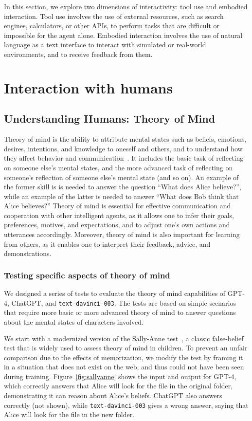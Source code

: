In this section, we explore two dimensions of interactivity: tool use and embodied interaction. Tool use involves the use of external resources, such as search engines, calculators, or other APIs, to perform tasks that are difficult or impossible for the agent alone. Embodied interaction involves the use of natural language as a text interface to interact with simulated or real-world environments, and to receive feedback from them. 

\section{Interaction with humans}
\label{sec:humans}

\subsection{Understanding Humans: Theory of Mind}
\label{sec:mind}

Theory of mind is the ability to attribute mental states such as beliefs, emotions, desires, intentions, and knowledge to oneself and others, and to understand how they affect behavior and communication~\cite{wellman1992child}. It includes the basic task of reflecting on someone else's mental states, and the more advanced task of reflecting on someone's reflection of someone else's mental state (and so on). An example of the former skill is is needed to answer the question ``What does Alice believe?'', while an example of the latter is needed to answer ``What does Bob think that Alice believes?'' Theory of mind is essential for effective communication and cooperation with other intelligent agents, as it allows one to infer their goals, preferences, motives, and expectations, and to adjust one's own actions and utterances accordingly. Moreover, theory of mind is also important for learning from others, as it enables one to interpret their feedback, advice, and demonstrations.

\subsubsection{Testing specific aspects of theory of mind} We designed a series of tests to evaluate the theory of mind capabilities of {GPT-4}, ChatGPT, and \texttt{text-davinci-003}. The tests are based on simple scenarios that require more basic or more advanced theory of mind to answer questions about the mental states of characters involved.

We start with a modernized version of the Sally-Anne test~\cite{baron1985does}, a classic false-belief test that is widely used to assess theory of mind in children. To prevent an unfair comparison due to the effects of memorization, we modify the test by framing it in a situation that does not exist on the web, and thus could not have been seen during training.
Figure~\ref{fig:sallyanne} shows the input and output for {GPT-4}, which correctly answers that Alice will look for the file in the original folder, demonstrating it can reason about Alice's beliefs. ChatGPT also answers correctly (not shown), while \texttt{text-davinci-003} gives a wrong answer, saying that Alice will look for the file in the new folder.

